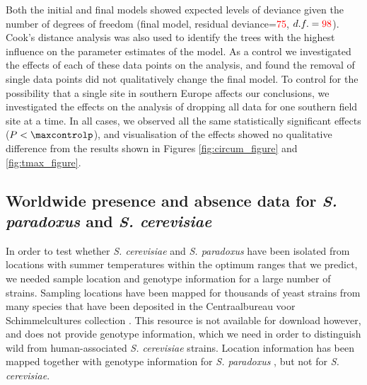 \documentclass[12pt]{article}
\begin{document}
\begin{linenumbers}
Both the initial and final models showed expected levels of deviance given the number of degrees of freedom (final model, residual deviance=\textcolor{red}{75}, $d.f.=\textcolor{red}{98}$). Cook's distance analysis was also used to identify the trees with the highest influence on the parameter estimates of the model. As a control we investigated the effects of each of these data points on the analysis, and found the removal of single data points did not qualitatively change the final model. To control for the possibility that a single site in southern Europe affects our conclusions, we investigated the effects on the analysis of dropping all data for one southern field site at a time. In all cases, we observed all the same statistically significant effects ($P<\maxcontrolp$), and visualisation of the effects showed no qualitative difference from the results shown in Figures \ref{fig:circum_figure} and \ref{fig:tmax_figure}.

\subsection*{Worldwide presence and absence data for \textit{S. paradoxus} and \textit{S. cerevisiae}}

In order to test whether \textit{S. cerevisiae} and \textit{S. paradoxus} have been isolated from locations with summer temperatures within the optimum ranges that we predict, we needed sample location and genotype information for a large number of strains. Sampling locations have been mapped for thousands of yeast strains from many species that have been deposited in the Centraalbureau voor Schimmelcultures collection \citep{robert_yeast_2006,kurtzman_advances_2015}. This resource is not available for download however, and does not provide genotype information, which we need in order to distinguish wild from human-associated \textit{S. cerevisiae} strains. Location information has been mapped together with genotype information for \textit{S. paradoxus} \citep{boynton_ecology_2014}, but not for \textit{S. cerevisiae}. 


\end{linenumbers}
\end{document}
